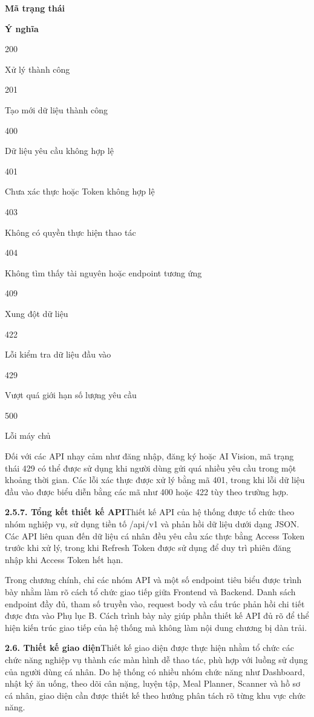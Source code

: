 \textbf{Mã trạng thái}

\textbf{Ý nghĩa}

200

Xử lý thành công

201

Tạo mới dữ liệu thành công

400

Dữ liệu yêu cầu không hợp lệ

401

Chưa xác thực hoặc Token không hợp lệ

403

Không có quyền thực hiện thao tác

404

Không tìm thấy tài nguyên hoặc endpoint tương ứng

409

Xung đột dữ liệu

422

Lỗi kiểm tra dữ liệu đầu vào

429

Vượt quá giới hạn số lượng yêu cầu

500

Lỗi máy chủ

Đối với các API nhạy cảm như đăng nhập, đăng ký hoặc AI Vision, mã trạng thái 429 có thể được sử dụng khi người dùng gửi quá nhiều yêu cầu trong một khoảng thời gian. Các lỗi xác thực được xử lý bằng mã 401, trong khi lỗi dữ liệu đầu vào được biểu diễn bằng các mã như 400 hoặc 422 tùy theo trường hợp.

\textbf{2.5.7. Tổng kết thiết kế API}Thiết kế API của hệ thống được tổ chức theo nhóm nghiệp vụ, sử dụng tiền tố /api/v1 và phản hồi dữ liệu dưới dạng JSON. Các API liên quan đến dữ liệu cá nhân đều yêu cầu xác thực bằng Access Token trước khi xử lý, trong khi Refresh Token được sử dụng để duy trì phiên đăng nhập khi Access Token hết hạn.

Trong chương chính, chỉ các nhóm API và một số endpoint tiêu biểu được trình bày nhằm làm rõ cách tổ chức giao tiếp giữa Frontend và Backend. Danh sách endpoint đầy đủ, tham số truyền vào, request body và cấu trúc phản hồi chi tiết được đưa vào Phụ lục B. Cách trình bày này giúp phần thiết kế API đủ rõ để thể hiện kiến trúc giao tiếp của hệ thống mà không làm nội dung chương bị dàn trải.

\textbf{2.6. Thiết kế giao diện}Thiết kế giao diện được thực hiện nhằm tổ chức các chức năng nghiệp vụ thành các màn hình dễ thao tác, phù hợp với luồng sử dụng của người dùng cá nhân. Do hệ thống có nhiều nhóm chức năng như Dashboard, nhật ký ăn uống, theo dõi cân nặng, luyện tập, Meal Planner, Scanner và hồ sơ cá nhân, giao diện cần được thiết kế theo hướng phân tách rõ từng khu vực chức năng.


